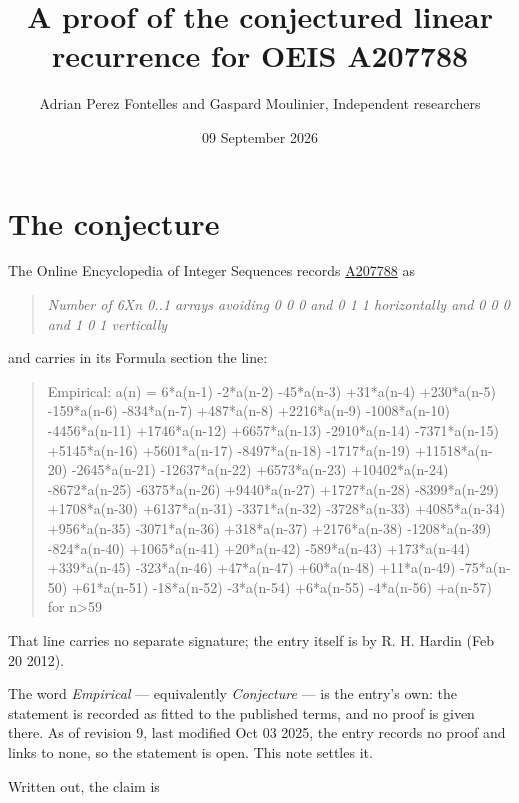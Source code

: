 \documentclass[11pt]{article}
\title{A proof of the conjectured linear recurrence for OEIS A207788}
\author{Adrian Perez Fontelles and Gaspard Moulinier, Independent researchers}
\date{09 September 2026}
\theoremstyle{definition}
\begin{document}
\maketitle
\section{The conjecture}

The Online Encyclopedia of Integer Sequences records \href{https://oeis.org/A207788}{A207788} as

\begin{quote}\itshape Number of 6Xn 0..1 arrays avoiding 0 0 0 and 0 1 1 horizontally and 0 0 0 and 1 0 1 vertically\end{quote}

and carries in its Formula section the line:

\begin{quote}\ttfamily Empirical: a(n) = 6*a(n-1) -2*a(n-2) -45*a(n-3) +31*a(n-4) +230*a(n-5) -159*a(n-6) -834*a(n-7) +487*a(n-8) +2216*a(n-9) -1008*a(n-10) -4456*a(n-11) +1746*a(n-12) +6657*a(n-13) -2910*a(n-14) -7371*a(n-15) +5145*a(n-16) +5601*a(n-17) -8497*a(n-18) -1717*a(n-19) +11518*a(n-20) -2645*a(n-21) -12637*a(n-22) +6573*a(n-23) +10402*a(n-24) -8672*a(n-25) -6375*a(n-26) +9440*a(n-27) +1727*a(n-28) -8399*a(n-29) +1708*a(n-30) +6137*a(n-31) -3371*a(n-32) -3728*a(n-33) +4085*a(n-34) +956*a(n-35) -3071*a(n-36) +318*a(n-37) +2176*a(n-38) -1208*a(n-39) -824*a(n-40) +1065*a(n-41) +20*a(n-42) -589*a(n-43) +173*a(n-44) +339*a(n-45) -323*a(n-46) +47*a(n-47) +60*a(n-48) +11*a(n-49) -75*a(n-50) +61*a(n-51) -18*a(n-52) -3*a(n-54) +6*a(n-55) -4*a(n-56) +a(n-57) for n>59\end{quote}

That line carries no separate signature; the entry itself is by R. H. Hardin (Feb 20 2012).

The word {\itshape Empirical} --- equivalently {\itshape Conjecture} --- is the entry's own: the statement is recorded as fitted to the published terms, and no proof is given there. As of revision 9, last modified Oct 03 2025, the entry records no proof and links to none, so the statement is open. This note settles it.

Written out, the claim is
\end{document}
